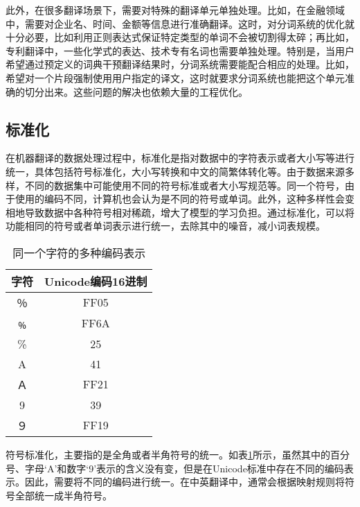 \parinterval 此外，在很多翻译场景下，需要对特殊的翻译单元单独处理。比如，在金融领域中，需要对企业名、时间、金额等信息进行准确翻译。这时，对分词系统的优化就十分必要，比如利用正则表达式保证特定类型的单词不会被切割得太碎；再比如，专利翻译中，一些化学式的表达、技术专有名词也需要单独处理。特别是，当用户希望通过预定义的词典干预翻译结果时，分词系统需要能配合相应的处理。比如，希望对一个片段强制使用用户指定的译文，这时就要求分词系统也能把这个单元准确的切分出来。这些问题的解决也依赖大量的工程优化。


\subsection{标准化}

\parinterval 在机器翻译的数据处理过程中，标准化是指对数据中的字符表示或者大小写等进行统一，具体包括符号标准化，大小写转换和中文的简繁体转化等。由于数据来源多样，不同的数据集中可能使用不同的符号标准或者大小写规范等。同一个符号，由于使用的编码不同，计算机也会认为是不同的符号或单词。此外，这种多样性会变相地导致数据中各种符号相对稀疏，增大了模型的学习负担。通过标准化，可以将功能相同的符号或者单词表示进行统一，去除其中的噪音，减小词表规模。

\begin{table}[htp]
\centering
\caption{同一个字符的多种编码表示}
\begin{tabular}{ c | c }
\rule{0pt}{13pt}	字符	&Unicode编码16进制 \\ \hline
\rule{0pt}{13pt} ％  & FF05 \\
\rule{0pt}{13pt} ﹪ & FF6A \\
\rule{0pt}{13pt} \% & 25 \\
\rule{0pt}{13pt} A & 41 \\
\rule{0pt}{13pt} Ａ & FF21 \\
\rule{0pt}{13pt} 9 & 39 \\
\rule{0pt}{13pt} ９ & FF19
\end{tabular}
\label{tab:7-1}
\end{table}

\parinterval 符号标准化，主要指的是全角或者半角符号的统一。如表\ref{tab:7-1}所示，虽然其中的百分号、字母‘A’和数字‘9’表示的含义没有变，但是在Unicode标准中存在不同的编码表示。因此，需要将不同的编码进行统一。在中英翻译中，通常会根据映射规则将符号全部统一成半角符号。

